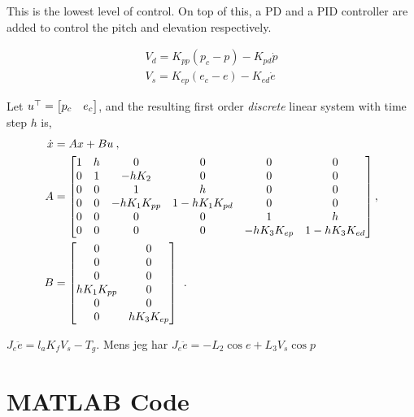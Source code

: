 This is the lowest level of control. On top of this, a PD and a PID controller are added to control the pitch and elevation respectively.

\begin{equation}
    \begin{split}
        V_d = K_{pp} (p_c - p) - K_{pd} \dot p \\
        V_s = K_{ep}(e_c - e)  - K_{ed} \dot e
    \end{split}
\end{equation}

Let $u^\top = \begin{bmatrix}p_c & e_c\end{bmatrix}$, and the  resulting first order \textit{discrete} linear system with time step $h$ is,
\begin{equation}
    \begin{split}
        \dot x &= Ax + Bu \: , \; \; \\
        A &= \begin{bmatrix}1 & h & 0 & 0 & 0 & 0 \\
                0 & 1 & -hK_2 & 0 & 0 & 0 \\
                0 & 0 & 1 & h & 0 & 0 \\
                0 & 0 & -hK_1 K_{pp} & 1-hK_1 K_{pd} & 0 & 0 \\
                0 & 0 & 0 & 0 & 1 & h \\
                0 & 0 & 0 & 0 & -hK_3 K_{ep} & 1-hK_3 K_{ed}\end{bmatrix}, \\
        B &= \begin{bmatrix}0 & 0 \\ 0 & 0 \\ 0 & 0 \\
                hK_1 K_{pp} & 0 \\ 0 & 0 \\ 0 & h K_3 K_{ep}\end{bmatrix} \: \: .
    \end{split}
\end{equation}


$J_e \ddot e = l_a K_f V_s - T_g.$
Mens jeg har 
$J_e \ddot e = -L_2 \cos e + L_3 V_s \cos p$




\chapter{MATLAB Code}

